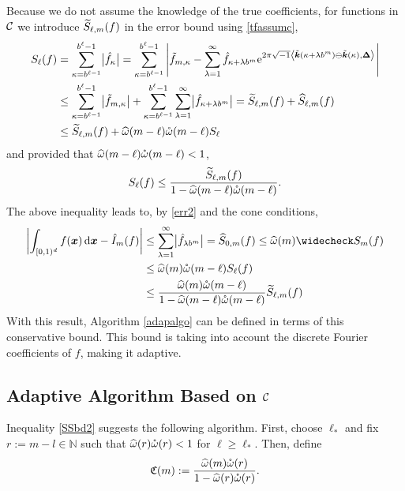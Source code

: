 \documentclass[graybox]{svmult}
\newcommand{\N}{\mathbb{N}} %
\newcommand{\bsx}{\boldsymbol{x}}    %
\newcommand{\bsDelta}{\boldsymbol{\Delta}}    %
\begin{document}
Because we do not assume the knowledge of the true coefficients, for functions in $\mathcal{C}$ we introduce $\widetilde{S}_{\ell,m}(f)$ in the error bound using \eqref{tfassumc},
\begin{align}
\nonumber
S_\ell(f) &= \sum_{\kappa=b^{\ell-1}}^{b^{\ell}-1} \bigl \lvert \hf_{\kappa}\bigr\rvert= \sum_{\kappa=b^{\ell-1}}^{b^{\ell}-1} \abs{\tf_{m,\kappa} - \sum_{\lambda=1}^{\infty} \hf_{\kappa+\lambda b^{m}} \E^{2 \pi \sqrt{-1} \ip{\tvk(\kappa+\lambda b^{m}) \ominus \tvk(\kappa)}{\bsDelta}}}\\
\nonumber
&\le \sum_{\kappa=b^{\ell-1}}^{b^{\ell}-1} \bigl \lvert \tf_{m,\kappa} \bigr\rvert + \sum_{\kappa=b^{\ell-1}}^{b^{\ell}-1} \sum_{\lambda=1}^{\infty} \bigl \lvert \hf_{\kappa+\lambda b^{m}}\bigr\rvert = \tS_{\ell,m}(f) + \hS_{\ell,m}(f) \\
\label{boundSumbsApproxa}
&\le \tS_{\ell,m}(f) + \homega(m-\ell) \wcomega(m-\ell) S_\ell\
\end{align}
and provided that $\widehat{\omega}(m-\ell) \mathring{\omega}(m-\ell)<1$,
\begin{equation}\label{boundSumsApproxb}
S_\ell(f) \le \frac{\tS_{\ell,m}(f)}{1 - \homega(m-\ell) \wcomega(m-\ell)}.
\end{equation}
The above inequality leads to, by \eqref{err2} and the cone conditions,
\begin{align}
\nonumber
\biggabs{\int_{\cube} f(\bsx) \, \D \bsx - \hI_m(f) }
&\le \sum_{\lambda=1}^{\infty} \bigabs{\hf_{\lambda b^{m}}} 
= \hS_{0,m}(f)\le \homega(m) \wcS_m(f)\\
\nonumber
&  \le \homega(m) \wcomega(m-\ell) S_\ell(f)\\
& \le  \frac{\homega(m) \wcomega(m-\ell)}{1 - \homega(m-\ell) \wcomega(m-\ell)}\tS_{\ell,m}(f)
\label{SSbd2}
\end{align}
With this result, Algorithm \ref{adapalgo} can be defined in terms of this conservative bound. This bound is taking into account the discrete Fourier coefficients of $f$, making it adaptive. 

\subsection{Adaptive Algorithm Based on $\mathcal{C}$}\label{algorithmsection}

Inequality \eqref{SSbd2} suggests the following algorithm. First, choose $\ell_*$ and fix $r:=m-l \in \N$ such that $\widehat{\omega}(r)\mathring{\omega}(r)<1$ for $\ell\geq\ell_*$. Then, define
\[
\mathfrak{C}(m):= \frac{\widehat{\omega}(m) \mathring{\omega}(r)}{1 - \widehat{\omega}(r) \mathring{\omega}(r)}.
\]
\end{document}
